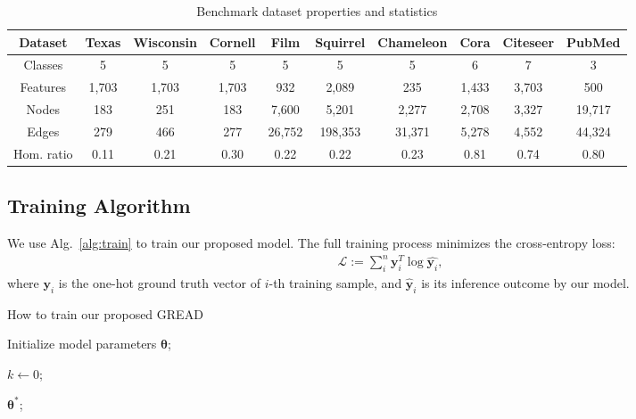 \documentclass{article}
\theoremstyle{plain}
\theoremstyle{definition}
\theoremstyle{remark}
\begin{document}
\begin{table*}[ht!]
    \small
    \centering
    \setlength{\tabcolsep}{2pt}
    \caption{Benchmark dataset properties and statistics}
    \begin{tabular}{c ccccccccc}\toprule
        Dataset         & Texas & Wisconsin & Cornell & Film   & Squirrel & Chameleon & Cora  & Citeseer & PubMed \\ \midrule
        Classes         & 5     & 5         & 5       & 5      & 5        & 5         & 6     & 7        & 3      \\
        Features        & 1,703 & 1,703     & 1,703   & 932    & 2,089    & 235       & 1,433 & 3,703    & 500    \\
        Nodes           & 183   & 251       & 183     & 7,600  & 5,201    & 2,277     & 2,708 & 3,327    & 19,717 \\
        Edges           & 279   & 466       & 277     & 26,752 & 198,353  & 31,371    & 5,278 & 4,552    & 44,324 \\
        Hom. ratio      & 0.11  & 0.21      & 0.30    & 0.22   & 0.22     & 0.23      & 0.81  & 0.74     & 0.80  \\
        \bottomrule
    \end{tabular}
    \label{tab:data}
\end{table*}

\subsection{Training Algorithm}
We use Alg.~\eqref{alg:train} to train our proposed model. The full training process minimizes the cross-entropy loss:
\begin{align}\label{eq:loss}
    \mathcal{L} := \sum_{i}^{n}{\mathbf{y}^T_i\log{\hat{\mathbf{y}_i}}},
\end{align} where $\mathbf{y}_i$ is the one-hot ground truth vector of $i$-th training sample, and $\hat{\mathbf{y}}_i$ is its inference outcome by our model. 



\begin{algorithm}[t]
\small
\SetAlgoLined
\caption{How to train our proposed GREAD}\label{alg:train}
Initialize model parameters $\mathbf{\theta}$;

$k \gets 0$;

\Return $\mathbf{\theta}^*$;
\end{algorithm}
\end{document}
